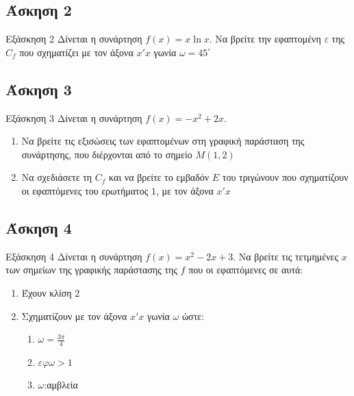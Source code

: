 \documentclass[greek]{beamer}
\begin{document}
\subsection{Άσκηση 2}
\begin{frame}[label=Άσκηση2]{Εξάσκηση 2}
 Δίνεται η συνάρτηση $f(x)=x\ln x$. Να βρείτε την εφαπτομένη $ε$ της $C_f$ που σχηματίζει με τον άξονα $x'x$ γωνία $ω=45^{\circ}$

\end{frame}

\subsection{Άσκηση 3}
\begin{frame}[label=Άσκηση3]{Εξάσκηση 3}
 Δίνεται η συνάρτηση $f(x)=-x^2+2x$.
 \begin{enumerate}
  \item<1-> Να βρείτε τις εξισώσεις των εφαπτομένων στη γραφική παράσταση της συνάρτησης, που διέρχονται από το σημείο $Μ(1,2)$
  \item<2-> Να σχεδιάσετε τη $C_f$ και να βρείτε το εμβαδόν $Ε$ του τριγώνουν που σχηματίζουν οι εφαπτόμενες του ερωτήματος $1$, με τον άξονα $x'x$
 \end{enumerate}

\end{frame}

\subsection{Άσκηση 4}
\begin{frame}[label=Άσκηση4]{Εξάσκηση 4}
 Δίνεται η συνάρτηση $f(x)=x^2-2x+3$. Να βρείτε τις τετμημένες $x$ των σημείων της γραφικής παράστασης της $f$ που οι εφαπτόμενες σε αυτά:
 \begin{enumerate}
  \item<1-> Έχουν κλίση $2$
  \item<2-> Σχηματίζουν με τον άξονα $x'x$ γωνία $ω$ ώστε:
   \begin{enumerate}
    \item<2-> $ω=\frac{3π}{4}$
    \item<3-> $εφω>1$
    \item<4-> $ω$:αμβλεία
   \end{enumerate}
 \end{enumerate}

\end{frame}
\end{document}
